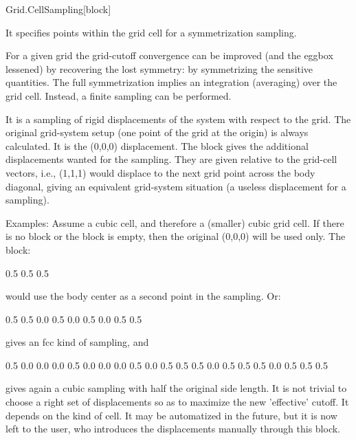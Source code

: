 \begin{fdfentry}{Grid.CellSampling}[block]

  It specifies points within the grid cell for a symmetrization
  sampling.

  For a given grid the grid-cutoff convergence can be improved (and
  the eggbox lessened) by recovering the lost symmetry: by
  symmetrizing the sensitive quantities. The full symmetrization
  implies an integration (averaging) over the grid cell. Instead, a
  finite sampling can be performed.

  It is a sampling of rigid displacements of the system with respect
  to the grid. The original grid-system setup (one point of the grid
  at the origin) is always calculated. It is the (0,0,0) displacement.
  The block  gives the additional
  displacements wanted for the sampling. They are given relative to
  the grid-cell vectors, i.e., (1,1,1) would displace to the next grid
  point across the body diagonal, giving an equivalent grid-system
  situation (a useless displacement for a sampling).

  Examples: Assume a cubic cell, and therefore a (smaller) cubic grid
  cell.  If there is no block or the block is empty, then the original
  (0,0,0) will be used only. The block:
  \begin{fdfexample}
        0.5    0.5    0.5
  \end{fdfexample}
  would use the body center as a second point in the sampling. Or:
  \begin{fdfexample}
        0.5    0.5    0.0
        0.5    0.0    0.5
        0.0    0.5    0.5
  \end{fdfexample}
  gives an fcc kind of sampling, and
  \begin{fdfexample}
        0.5    0.0    0.0
        0.0    0.5    0.0
        0.0    0.0    0.5
        0.0    0.5    0.5
        0.5    0.0    0.5
        0.5    0.5    0.0
        0.5    0.5    0.5
  \end{fdfexample}
  gives again a cubic sampling with half the original side length.  It
  is not trivial to choose a right set of displacements so as to
  maximize the new 'effective' cutoff. It depends on the kind of
  cell. It may be automatized in the future, but it is now left to the
  user, who introduces the displacements manually through this block.


\end{fdfentry}
